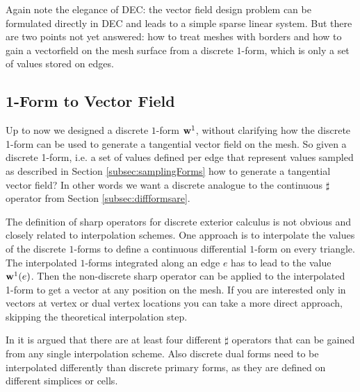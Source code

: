 Again note the elegance of DEC: the vector field design problem can be formulated directly in DEC and leads to a simple sparse linear system. But there are two points not yet answered: how to treat meshes with borders and how to gain a vectorfield on the mesh surface from a discrete $1$-form, which is only a set of values stored on edges.

\subsection{1-Form to Vector Field}
Up to now we designed a discrete $1$-form $\textbf{w}^1$, without clarifying how the discrete 1-form can be used to generate a tangential vector field on the mesh. So given a discrete  1-form, i.e. a set of values defined per edge that represent values sampled as described in Section  \ref{subsec:samplingForms} how to generate a tangential vector field? In other words we want a discrete analogue to the continuous $\sharp$ operator from Section \ref{subsec:diffformsare}.

The definition of sharp operators for discrete exterior calculus is not obvious and closely related to interpolation schemes. One approach is to interpolate the values of the discrete $1$-forms to define a continuous differential $1$-form on every triangle. The interpolated $1$-forms integrated along an edge $e$ has to lead to the value $\textbf{w}^1(e)$. Then the non-discrete sharp operator can be applied to the interpolated 1-form to get a vector at any position on the mesh.
If you are interested only in vectors at vertex or dual vertex locations you can take a more direct approach, skipping the theoretical interpolation step.

In \note{[Hirani]} it is argued that there are at least four different $\sharp$ operators that can be gained from any single interpolation scheme. Also discrete dual forms need to be interpolated differently than discrete primary forms, as they are defined on different simplices or cells. 

